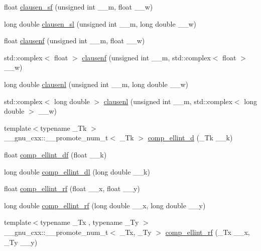 \begin{DoxyCompactItemize}
\item 
float \hyperlink{namespace____gnu__cxx_a2308b5828b5a8003d16cfa0f90826f94}{clausen\+\_\+sf} (unsigned int \+\_\+\+\_\+m, float \+\_\+\+\_\+w)
\item 
long double \hyperlink{namespace____gnu__cxx_a6eb205278e3807367b62e07c3f39d915}{clausen\+\_\+sl} (unsigned int \+\_\+\+\_\+m, long double \+\_\+\+\_\+w)
\item 
float \hyperlink{namespace____gnu__cxx_a9e228490e55e7936f77ae7a5ef9821dc}{clausenf} (unsigned int \+\_\+\+\_\+m, float \+\_\+\+\_\+w)
\item 
std\+::complex$<$ float $>$ \hyperlink{namespace____gnu__cxx_a769ee593c5f1c1d8148abb9bebe50821}{clausenf} (unsigned int \+\_\+\+\_\+m, std\+::complex$<$ float $>$ \+\_\+\+\_\+w)
\item 
long double \hyperlink{namespace____gnu__cxx_aac0a4d039044c04cd26c9b8559c441fd}{clausenl} (unsigned int \+\_\+\+\_\+m, long double \+\_\+\+\_\+w)
\item 
std\+::complex$<$ long double $>$ \hyperlink{namespace____gnu__cxx_a6e1e9929ace5a66d970c308554473a26}{clausenl} (unsigned int \+\_\+\+\_\+m, std\+::complex$<$ long double $>$ \+\_\+\+\_\+w)
\item 
{\footnotesize template$<$typename \+\_\+\+Tk $>$ }\\\+\_\+\+\_\+gnu\+\_\+cxx\+::\+\_\+\+\_\+promote\+\_\+num\+\_\+t$<$ \+\_\+\+Tk $>$ \hyperlink{namespace____gnu__cxx_ad0fb35dfc5aef8ba2ba5fb88da1192c7}{comp\+\_\+ellint\+\_\+d} (\+\_\+\+Tk \+\_\+\+\_\+k)
\item 
float \hyperlink{namespace____gnu__cxx_a34ac6488b0e7531d5d4b7a8e31ff864e}{comp\+\_\+ellint\+\_\+df} (float \+\_\+\+\_\+k)
\item 
long double \hyperlink{namespace____gnu__cxx_a494931ec0a271b79f1fdcfdf929e3138}{comp\+\_\+ellint\+\_\+dl} (long double \+\_\+\+\_\+k)
\item 
float \hyperlink{namespace____gnu__cxx_a55ae30b4f8ff15017d18a80050e14e38}{comp\+\_\+ellint\+\_\+rf} (float \+\_\+\+\_\+x, float \+\_\+\+\_\+y)
\item 
long double \hyperlink{namespace____gnu__cxx_ae1d468487f1711e91719a9c6392f3c35}{comp\+\_\+ellint\+\_\+rf} (long double \+\_\+\+\_\+x, long double \+\_\+\+\_\+y)
\item 
{\footnotesize template$<$typename \+\_\+\+Tx , typename \+\_\+\+Ty $>$ }\\\+\_\+\+\_\+gnu\+\_\+cxx\+::\+\_\+\+\_\+promote\+\_\+num\+\_\+t$<$ \+\_\+\+Tx, \+\_\+\+Ty $>$ \hyperlink{namespace____gnu__cxx_a98dd868dcb97e26971dfa8ac4db24df3}{comp\+\_\+ellint\+\_\+rf} (\+\_\+\+Tx \+\_\+\+\_\+x, \+\_\+\+Ty \+\_\+\+\_\+y)

\end{DoxyCompactItemize}
